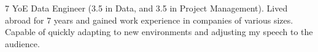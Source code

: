 

\begin{cvparagraph}

7 YoE Data Engineer (3.5 in Data, and 3.5 in Project Management). 
Lived abroad for 7 years and gained work experience in companies of various sizes. Capable of quickly adapting to new environments and adjusting my speech to the audience.\end{cvparagraph}

